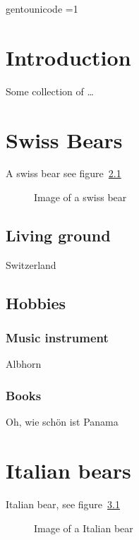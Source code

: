  \ifdefined\directlua
 \pdfvariable gentounicode =1
 \protected\def\pdfglyphtounicode {\pdfextension glyphtounicode } 
 
 \fi
\tableofcontents

\listoffigures

\newpage

\chapter{Introduction}

Some collection of \ldots 


\chapter{Swiss Bears}

A swiss bear see figure~\ref{fig:swissbear}

\begin{figure}
\caption{Image of a swiss bear\label{fig:swissbear}}
\end{figure}

\section{Living ground}

Switzerland

\section{Hobbies}

\subsection{Music instrument}
Albhorn

\subsection{Books}
Oh, wie schön ist Panama


\chapter{Italian bears}

Italian bear, see figure~\ref{fig:italianbear}

\begin{figure}
\caption{Image of a Italian bear\label{fig:italianbear}}
\end{figure}

